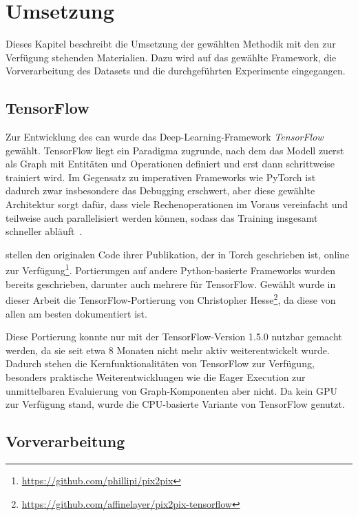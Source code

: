\chapter{Umsetzung}

Dieses Kapitel beschreibt die Umsetzung der gewählten Methodik mit den zur Verfügung stehenden Materialien.
Dazu wird auf das gewählte Framework, die Vorverarbeitung des Datasets und die durchgeführten Experimente eingegangen.



\section{TensorFlow}

Zur Entwicklung des \gls{can} wurde das Deep-Learning-Framework \emph{TensorFlow}~\cite{Abadi.2016} gewählt.
TensorFlow liegt ein Paradigma zugrunde, nach dem das Modell zuerst als Graph mit Entitäten und Operationen definiert und erst dann schrittweise trainiert wird.
Im Gegensatz zu imperativen Frameworks wie PyTorch ist dadurch zwar insbesondere das Debugging erschwert, aber diese gewählte Architektur sorgt dafür, dass viele Rechenoperationen im Voraus vereinfacht und teilweise auch parallelisiert werden können, sodass das Training insgesamt schneller abläuft~\cite{Goodfellow.2016}.

\citeauthor{Isola.2017} stellen den originalen Code ihrer Publikation, der in Torch geschrieben ist, online zur Verfügung\footnote{\url{https://github.com/phillipi/pix2pix}}.
Portierungen auf andere Python-basierte Frameworks wurden bereits geschrieben, darunter auch mehrere für TensorFlow.
Gewählt wurde in dieser Arbeit die TensorFlow-Portierung von Christopher Hesse\footnote{\url{https://github.com/affinelayer/pix2pix-tensorflow}}, da diese von allen am besten dokumentiert ist.

Diese Portierung konnte nur mit der TensorFlow-Version 1.5.0 nutzbar gemacht werden, da sie seit etwa 8 Monaten nicht mehr aktiv weiterentwickelt wurde.
Dadurch stehen die Kernfunktionalitäten von TensorFlow zur Verfügung, besonders praktische Weiterentwicklungen wie die Eager Execution zur unmittelbaren Evaluierung von Graph-Komponenten aber nicht.
Da kein GPU zur Verfügung stand, wurde die CPU-basierte Variante von TensorFlow genutzt.



\section{Vorverarbeitung}

